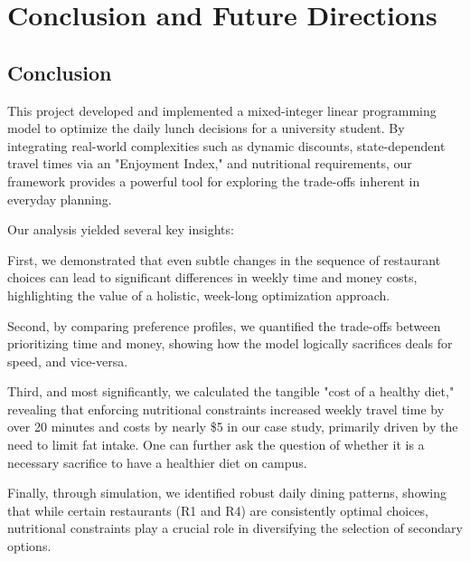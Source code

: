 \documentclass{article}
\begin{document}
\section{Conclusion and Future Directions}

\subsection{Conclusion}
This project developed and implemented a mixed-integer linear programming model to optimize the daily lunch decisions for a university student. By integrating real-world complexities such as dynamic discounts, state-dependent travel times via an "Enjoyment Index," and nutritional requirements, our framework provides a powerful tool for exploring the trade-offs inherent in everyday planning.

Our analysis yielded several key insights:

First, we demonstrated that even subtle changes in the sequence of restaurant choices can lead to significant differences in weekly time and money costs, highlighting the value of a holistic, week-long optimization approach. 

Second, by comparing preference profiles, we quantified the trade-offs between prioritizing time and money, showing how the model logically sacrifices deals for speed, and vice-versa. 

Third, and most significantly, we calculated the tangible "cost of a healthy diet," revealing that enforcing nutritional constraints increased weekly travel time by over 20 minutes and costs by nearly \$5 in our case study, primarily driven by the need to limit fat intake. One can further ask the question of whether it is a necessary sacrifice to have a healthier diet on campus.

Finally, through simulation, we identified robust daily dining patterns, showing that while certain restaurants (R1 and R4) are consistently optimal choices, nutritional constraints play a crucial role in diversifying the selection of secondary options.
\end{document}
